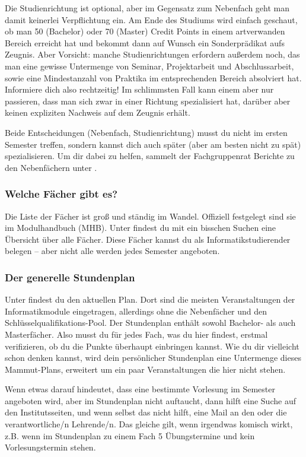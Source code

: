 	Die Studienrichtung ist  optional, aber im Gegensatz zum Nebenfach geht man damit keinerlei Verpflichtung ein. Am Ende des Studiums wird einfach geschaut, ob man 50 (Bachelor) oder 70 (Master) Credit Points in einem artverwanden Bereich erreicht hat und bekommt dann auf Wunsch ein Sonderprädikat aufs Zeugnis. Aber Vorsicht: manche Studienrichtungen erfordern außerdem noch, das man eine gewisse Untermenge von Seminar, Projektarbeit und Abschlussarbeit, sowie eine Mindestanzahl von Praktika im entsprechenden Bereich absolviert hat. Informiere dich also rechtzeitig! Im schlimmsten Fall kann einem aber nur passieren, dass man sich zwar in einer Richtung spezialisiert hat, darüber aber keinen expliziten Nachweis auf dem Zeugnis erhält.

	Beide Entscheidungen (Nebenfach, Studienrichtung) musst du nicht im ersten Semester treffen, sondern kannst dich auch später (aber am besten nicht zu spät) spezialisieren. Um dir dabei zu helfen, sammelt der Fachgruppenrat Berichte zu den Nebenfächern unter .

\subsubsection{Welche Fächer gibt es?}
	Die Liste der Fächer ist groß und ständig im Wandel. Offiziell festgelegt sind sie im Modulhandbuch (MHB). Unter  findest du mit ein bisschen Suchen eine Übersicht über alle Fächer. Diese Fächer kannst du als Informatikstudierender belegen -- aber nicht alle werden jedes Semester angeboten.

\subsubsection{Der generelle Stundenplan}
	Unter  findest du den aktuellen Plan. Dort sind die meisten Veranstaltungen der Informatikmodule eingetragen, allerdings ohne die Nebenfächer und den Schlüsselqualifikations-Pool. Der Stundenplan enthält sowohl Bachelor- als auch Masterfächer. Also musst du für jedes Fach, was du hier findest, erstmal verifizieren, ob du die Punkte überhaupt einbringen kannst. Wie du dir vielleicht schon denken kannst, wird dein persönlicher Stundenplan eine Untermenge dieses Mammut-Plans, erweitert um ein paar Veranstaltungen die hier nicht stehen.

	Wenn etwas darauf hindeutet, dass eine bestimmte Vorlesung im Semester angeboten wird, aber im Stundenplan nicht auftaucht, dann hilft eine Suche auf den Institutsseiten, und wenn selbst das nicht hilft, eine Mail an den oder die verantwortliche/n Lehrende/n. Das gleiche gilt, wenn irgendwas komisch wirkt, z.B. wenn im Stundenplan zu einem Fach 5 Übungstermine und kein Vorlesungstermin stehen.

